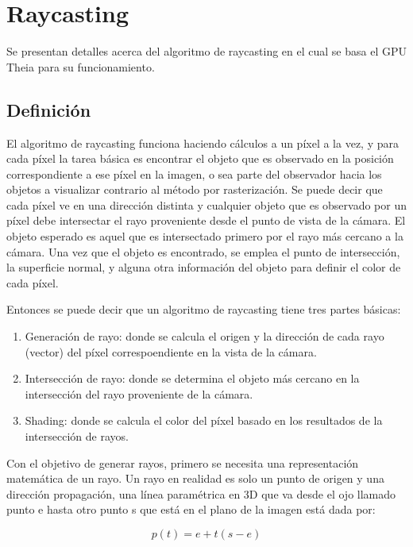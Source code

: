 \section{Raycasting}

Se presentan detalles acerca del algoritmo de raycasting en el cual se basa el GPU Theia para su funcionamiento.

\subsection{Definición}

El algoritmo de raycasting funciona haciendo cálculos a un píxel a la vez, y para cada píxel la tarea básica es encontrar el objeto que es observado en la posición correspondiente a ese píxel en la imagen, o sea parte del observador hacia los objetos a visualizar contrario al método por rasterización. Se puede decir que cada píxel ve en una dirección distinta y cualquier objeto que es observado por un píxel debe intersectar el rayo proveniente desde el punto de vista de la cámara. El objeto esperado es aquel que es intersectado primero por el rayo más cercano a la cámara. Una vez que el objeto es encontrado, se emplea el punto de intersección, la superficie normal, y alguna otra información del objeto para definir el color de cada píxel. 

Entonces se puede decir que un algoritmo de raycasting tiene tres partes básicas:

\begin{enumerate}

\item Generación de rayo: donde se calcula el origen y la dirección de cada rayo (vector) del píxel correspoendiente en la vista de la cámara.
\item Intersección de rayo: donde se determina el objeto más cercano en la intersección del rayo proveniente de la cámara.
\item Shading: donde se calcula el color del píxel basado en los resultados de la intersección de rayos.

\end{enumerate}

Con el objetivo de generar rayos, primero se necesita una representación matemática de un rayo. Un rayo en realidad es solo un punto de origen y una dirección propagación, una línea paramétrica en 3D que va desde el ojo llamado punto e hasta otro punto s que está en el plano de la imagen está dada por: 

\begin{equation}
\label{eq:ray_definition}
  p(t) = e+t(s-e)
\end{equation}

